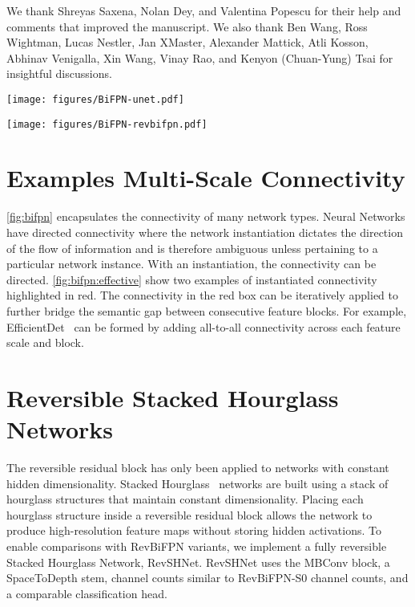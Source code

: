 \documentclass{article}
\begin{document}
We thank Shreyas Saxena, Nolan Dey, and Valentina Popescu for their help and comments that improved the manuscript. We also thank Ben Wang, Ross Wightman, Lucas Nestler, Jan XMaster, Alexander Mattick, Atli Kosson, Abhinav Venigalla, Xin Wang, Vinay Rao, and Kenyon (Chuan-Yung) Tsai for insightful discussions.

\clearpage




{ \lipsum[1-3]}




\appendix



\begin{figure*}[!ht]
\centering
    \texttt{[image: figures/BiFPN-unet.pdf]}
\vskip 10pt


\texttt{[image: figures/BiFPN-revbifpn.pdf]}
\vskip -5pt
    \caption{Effective multi-scale connectivity of U-Net (Top) and RevBiFPN (Bottom).}
    \label{fig:bifpn:effective}
\end{figure*}


\newpage
\section{Examples Multi-Scale Connectivity}
\label{sec:cnnectivity_ex}

\cref{fig:bifpn} encapsulates the connectivity of many network types.
Neural Networks have directed connectivity where the network instantiation dictates the direction of the flow of information and is therefore ambiguous unless pertaining to a particular network instance.
With an instantiation, the connectivity can be directed.
\cref{fig:bifpn:effective} show two examples of instantiated connectivity highlighted in red. The connectivity in the red box can be iteratively applied to further bridge the semantic gap between consecutive feature blocks. For example, EfficientDet~\cite{tan2020efficientdet} can be formed by adding all-to-all connectivity across each feature scale and block.


\section{Reversible Stacked Hourglass Networks}

The reversible residual block \cite{gomez2017reversible} has only been applied to networks with constant hidden dimensionality.
Stacked Hourglass~\cite{newell2016stacked} networks are built using a stack of hourglass structures that maintain constant dimensionality.
Placing each hourglass structure inside a reversible residual block allows the network to produce high-resolution feature maps without storing hidden activations.
To enable comparisons with RevBiFPN variants, we implement a fully reversible Stacked Hourglass Network, RevSHNet.
RevSHNet uses the MBConv block, a SpaceToDepth stem, channel counts similar to RevBiFPN-S0 channel counts, and a comparable classification head.
\end{document}
